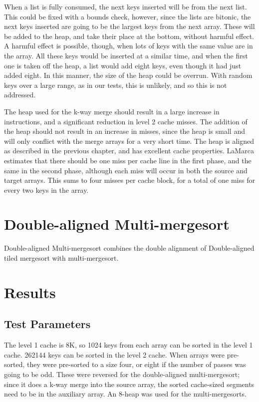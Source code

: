 When a list is fully consumed, the next keys inserted will be from the next
list. This could be fixed with a bounds check, however, since the lists are
bitonic, the next keys inserted are going to be the largest keys from the next
array. These will be added to the heap, and take their place at the bottom,
without harmful effect. A harmful effect is possible, though, when lots of keys 
with the same value are in the array. All these keys would be inserted at a
similar time, and when the first one is taken off the heap, a list would add
eight keys, even though it had just added eight. In this manner, the size of the
heap could be overrun. With random keys over a large range, as in our tests,
this is unlikely, and so this is not addressed.

The heap used for the k-way merge should result in a large increase in
instructions, and a significant reduction in level 2 cache misses. The addition
of the heap should not result in an increase in misses, since the heap is small
and will only conflict with the merge arrays for a very short time. The heap is
aligned as described in the previous chapter, and has excellent cache
properties. LaMarca estimates that there should be one miss per cache line
in the first phase, and the same in the second phase, although each miss will
occur in both the source and target arrays. This sums to four misses per cache
block, for a total of one miss for every two keys in the array.

\section{Double-aligned Multi-mergesort}

Double-aligned Multi-mergesort combines the double alignment of Double-aligned
tiled mergesort with multi-mergesort.

\section{Results}
\subsection{Test Parameters}
The level 1 cache is 8K, so 1024 keys from each array can be sorted in the level
1 cache. 262144 keys can be sorted in the level 2 cache. When arrays were
pre-sorted, they were pre-sorted to a size four, or eight if the number of
passes was going to be odd. These were reversed for the double-aligned
multi-mergesort; since it does a k-way merge into the source array, the sorted
cache-sized segments need to be in the auxiliary array. An 8-heap was used for
the multi-mergesorts.

